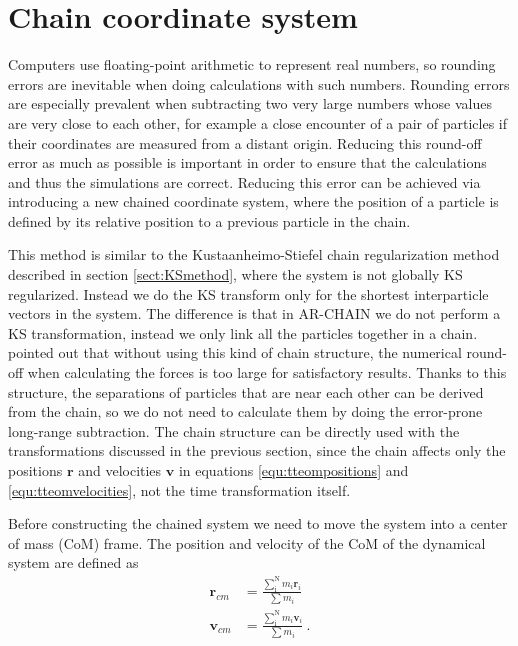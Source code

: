 \documentclass[english, oneside]{HYgradu}
\begin{document}
\section{Chain coordinate system} \label{sect:ChainSystem}

Computers use floating-point arithmetic to represent real numbers, so rounding errors are inevitable when doing calculations with such numbers. Rounding errors are especially prevalent when subtracting two very large numbers whose values are very close to each other, for example a close encounter of a pair of particles if their coordinates are measured from a distant origin. Reducing this round-off error as much as possible is important in order to ensure that the calculations and thus the simulations are correct. Reducing this error can be achieved via introducing a new chained coordinate system, where the position of a particle is defined by its relative position to a previous particle in the chain.

This method is similar to the Kustaanheimo-Stiefel chain regularization method \citep{mikkola:1993} described in section \ref{sect:KSmethod}, where the system is not globally KS regularized. Instead we do the KS transform only for the shortest interparticle vectors in the system. The difference is that in AR-CHAIN we do not perform a KS transformation, instead we only link all the particles together in a chain. \cite{mikkola:1999} pointed out that without using this kind of chain structure, the numerical round-off when calculating the forces is too large for satisfactory results. Thanks to this structure, the separations of particles that are near each other can be derived from the chain, so we do not need to calculate them by doing the error-prone long-range subtraction.
The chain structure can be directly used with the transformations discussed in the previous section, since the chain affects only the positions $\boldsymbol{r}$ and velocities $\boldsymbol{v}$ in equations \eqref{equ:tteompositions} and \eqref{equ:tteomvelocities}, not the time transformation itself.

Before constructing the chained system we need to move the system into a center of mass (CoM) frame. The position and velocity of the CoM of the dynamical system are defined as
\begin{equation}
\begin{aligned}
\boldsymbol{r}_{cm} &= \frac{\sum_\mathrm{i}^\mathrm{N} m_i \boldsymbol{r}_i}{\sum m_i} \\
\boldsymbol{v}_{cm} &= \frac{\sum_\mathrm{i}^\mathrm{N} m_i \boldsymbol{v}_i}{\sum m_i} \ .
\end{aligned}
\end{equation}
\end{document}
